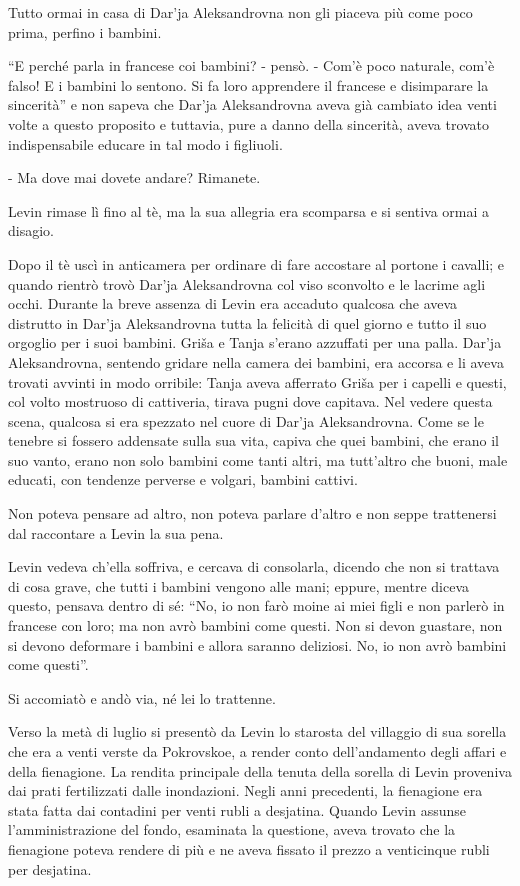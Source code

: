 Tutto ormai in casa di Dar'ja Aleksandrovna non gli piaceva più come poco prima, perfino i bambini. 

``E perché parla in francese coi bambini? - pensò. - Com'è poco naturale, com'è falso! E i bambini lo sentono. Si fa loro apprendere il francese e disimparare la sincerità'' e non sapeva che Dar'ja Aleksandrovna aveva già cambiato idea venti volte a questo proposito e tuttavia, pure a danno della sincerità, aveva trovato indispensabile educare in tal modo i figliuoli. 

- Ma dove mai dovete andare? Rimanete. 

Levin rimase lì fino al tè, ma la sua allegria era scomparsa e si sentiva ormai a disagio. 

Dopo il tè uscì in anticamera per ordinare di fare accostare al portone i cavalli; e quando rientrò trovò Dar'ja Aleksandrovna col viso sconvolto e le lacrime agli occhi. Durante la breve assenza di Levin era accaduto qualcosa che aveva distrutto in Dar'ja Aleksandrovna tutta la felicità di quel giorno e tutto il suo orgoglio per i suoi bambini. Griša e Tanja s'erano azzuffati per una palla. Dar'ja Aleksandrovna, sentendo gridare nella camera dei bambini, era accorsa e li aveva trovati avvinti in modo orribile: Tanja aveva afferrato Griša per i capelli e questi, col volto mostruoso di cattiveria, tirava pugni dove capitava. Nel vedere questa scena, qualcosa si era spezzato nel cuore di Dar'ja Aleksandrovna. Come se le tenebre si fossero addensate sulla sua vita, capiva che quei bambini, che erano il suo vanto, erano non solo bambini come tanti altri, ma tutt'altro che buoni, male educati, con tendenze perverse e volgari, bambini cattivi. 

Non poteva pensare ad altro, non poteva parlare d'altro e non seppe trattenersi dal raccontare a Levin la sua pena. 

Levin vedeva ch'ella soffriva, e cercava di consolarla, dicendo che non si trattava di cosa grave, che tutti i bambini vengono alle mani; eppure, mentre diceva questo, pensava dentro di sé: ``No, io non farò moine ai miei figli e non parlerò in francese con loro; ma non avrò bambini come questi. Non si devon guastare, non si devono deformare i bambini e allora saranno deliziosi. No, io non avrò bambini come questi''. 

Si accomiatò e andò via, né lei lo trattenne. 

\label{xi-2} 

Verso la metà di luglio si presentò da Levin lo starosta del villaggio di sua sorella che era a venti verste da Pokrovskoe, a render conto dell'andamento degli affari e della fienagione. La rendita principale della tenuta della sorella di Levin proveniva dai prati fertilizzati dalle inondazioni. Negli anni precedenti, la fienagione era stata fatta dai contadini per venti rubli a desjatina. Quando Levin assunse l'amministrazione del fondo, esaminata la questione, aveva trovato che la fienagione poteva rendere di più e ne aveva fissato il prezzo a venticinque rubli per desjatina. 

